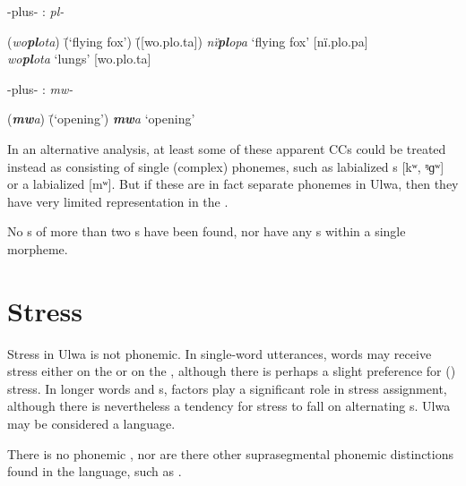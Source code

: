 \ea%
    \label{ex:phon:60c}
{ -plus- : \textit{pl-}}\\
\begin{tabbing}
{(\textit{wo\textbf{pl}ota})} \= {(‘flying fox’)} \= {([wo.plo.ta])}\kill
{\textit{nï\textbf{pl}opa}} \> {‘flying fox’} \> {[nï.plo.pa]}\\
{\textit{wo\textbf{pl}ota}} \> {‘lungs’} \> {[wo.plo.ta]}
\end{tabbing}
\z

\ea%
    \label{ex:phon:60d}
{ -plus- : \textit{mw-}}\\
\begin{tabbing}
{(\textit{\textbf{mw}a})} \= {(‘opening’)}\kill
{\textit{\textbf{mw}a}} \> {‘opening’}
  \end{tabbing}
\z


In an alternative analysis, at least some of these apparent CCs could be treated instead as consisting of single (complex) phonemes, such as  labialized  s [kʷ, ᵑɡʷ] or a labialized   [mʷ]. But if these are in fact separate phonemes in Ulwa, then they have very limited representation in the .

  No s of more than two s have been found, nor have any s within a single morpheme.


\section{Stress}\label{sec:2.4}


Stress in Ulwa is not phonemic. In single-word utterances,  words may receive stress either on the  or on the , although there is perhaps a slight preference for  () stress. In longer words and s,  factors play a significant role in stress assignment, although there is nevertheless a tendency for stress to fall on alternating s. Ulwa may be considered a  language.

  There is no phonemic , nor are there other  suprasegmental phonemic distinctions found in the language, such as   .


